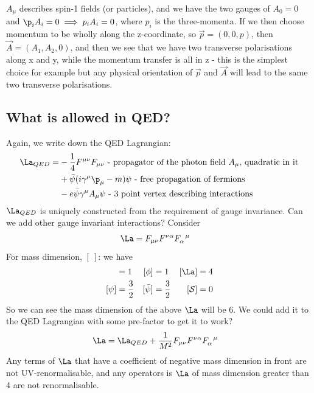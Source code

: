 \documentclass[a4paper, 11pt, normalem]{report}
\begin{document}
$A_\mu$ describes spin-1 fields (or particles), and we have the two gauges of $A_0 = 0$ and $\p_i A_i = 0 \implies p_i A_i = 0$, where $p_i$ is the three-momenta.
If we then choose momentum to be wholly along the z-coordinate, so $\vec{p}=(0,0,p)$, then $\vec{A} = (A_1,A_2,0)$, and then we see that we have two transverse polarisations along x and y, while the momentum transfer is all in z - this is the simplest choice for example but any physical orientation of $\vec{p}$ and $\vec{A}$ will lead to the same two transverse polarisations.

\subsection{What is allowed in QED?}
Again, we write down the QED Lagrangian:
\begin{align}
    \La_{QED} = &-\frac14 F^{\mu\nu}F_{\mu\nu} \text{ - propagator of the photon field $A_\mu$, quadratic in it} \nonumber \\
                &+ \bar{\psi}(i\gamma^\mu\p_\mu -m)\psi \text{ - free propagation of fermions} \nonumber \\
                &- e\bar{\psi}\gamma^\mu A_\mu\psi \text{ - 3 point vertex describing interactions}
\end{align}
$\La_{QED}$ is uniquely constructed from the requirement of gauge invariance.
Can we add other gauge invariant interactions?
Consider
\begin{align}
    \La &= F_{\mu\nu}F^{\nu\alpha}\tensor{F}{_\alpha^\mu}
\end{align}
For mass dimension, $[\:]$: we have
\begin{align}
    [A_\mu] &= 1 & [\phi] & = 1 & [\La] &= 4 \\
    [\psi] &= \frac32 & [\bar{\psi}] &= \frac32 & [\mathcal{S}] &= 0
\end{align}
So we can see the mass dimension of the above $\La$ will be 6.
We could add it to the QED Lagrangian with some pre-factor to get it to work?
\begin{align}
    \La &= \La_{QED} + \frac{1}{M^2}F_{\mu\nu}F^{\nu\alpha}\tensor{F}{_\alpha^\mu}
\end{align}
Any terms of $\La$ that have a coefficient of negative mass dimension in front are not UV-renormalisable, and any operators is $\La$ of mass dimension greater than 4 are not renormalisable.
\end{document}
